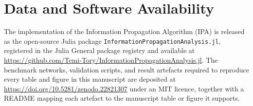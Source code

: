 \documentclass[preprint,12pt]{elsarticle}
\begin{document}
\section*{Data and Software Availability}

\begin{sloppypar}
The implementation of the Information Propagation Algorithm (IPA) is released as the open-source Julia package \texttt{InformationPropagationAnalysis.jl}, registered in the Julia General package registry and available at \url{https://github.com/Temi-Tory/InformationPropagationAnalysis.jl}. The benchmark networks, validation scripts, and result artefacts required to reproduce every table and figure in this manuscript are deposited at \url{https://doi.org/10.5281/zenodo.22821307} under an MIT licence, together with a README mapping each artefact to the manuscript table or figure it supports.
\end{sloppypar}
\end{document}
